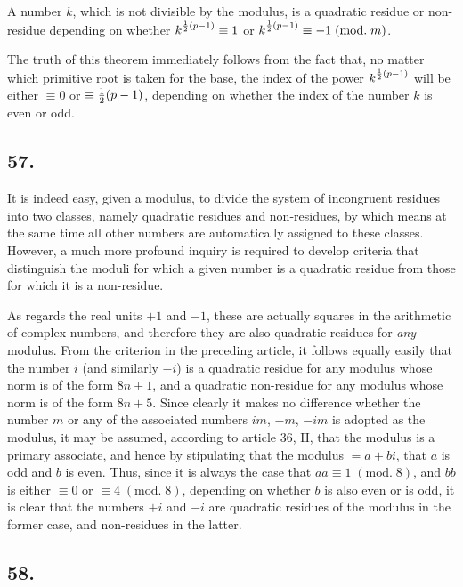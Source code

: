 \documentclass[twoside,12pt]{memoir}
\renewcommand{\pmod}[1]{\;(\textrm{mod.}\;#1)}
\let\oldfrac\frac
\def\frac#1#2{\mathchoice{\tfrac{#1}{#2}}{\oldfrac{#1}{#2}}{\genfrac{}{}{}{2}{#1}{#2\mathstrut}}{\genfrac{}{}{}{3}{#1}{#2\mathstrut}}}
\begin{document}
A number \(k\), which is not divisible by the modulus, is a quadratic residue or non-residue depending on whether \(k^{\frac{1}{2}(p-1)} \equiv 1\) or \(k^{\frac{1}{2}(p-1)} \equiv -1 \pmod{m}\).
 
The truth of this theorem immediately follows from the fact that, no matter which primitive root is taken for the base, the index of the power \(k^{\frac{1}{2}(p-1)}\) will be either \(\equiv 0\) or \(\equiv \frac{1}{2}(p-1) \), depending on whether the index of the number \(k\) is even or odd.
%

\subsection*{57.}

It is indeed easy, given a modulus, to divide the system of incongruent residues into two classes, namely quadratic residues and non-residues, by which means at the same time all other numbers are automatically assigned to these classes. However, a much more profound inquiry is required to develop criteria that distinguish the moduli for which a given number is a quadratic residue from those for which it is a non-residue.

As regards the real units \(+1\) and \(-1\), these are actually squares in the arithmetic of complex numbers, and therefore they are also quadratic residues for \textit{any} modulus.  From the criterion in the preceding article, it follows equally easily that the number \(i\) (and similarly \(-i\)) is a quadratic residue for any modulus whose norm is of the form \(8n+1\), and a quadratic non-residue for any modulus whose norm is of the form \(8n+5\). Since clearly it makes no difference whether the number \(m\) or any of the associated numbers \(im\), \(-m\), \(-im\) is adopted as the modulus, it may be assumed, according to article 36, II, that the modulus is a primary associate, and hence by stipulating that the modulus \(=a+bi\), that \(a\) is odd and \(b\) is even. Thus, since it is always the case that \(a a\equiv 1\pmod{8}\), and \(b b\) is either \(\equiv 0\) or \(\equiv 4\pmod{8}\), depending on whether \(b\) is also even or is odd, it is clear that the numbers \(+i\) and \(-i\) are quadratic residues of the modulus in the former case, and non-residues in the latter.
%

\subsection*{58.}
 
\end{document}
